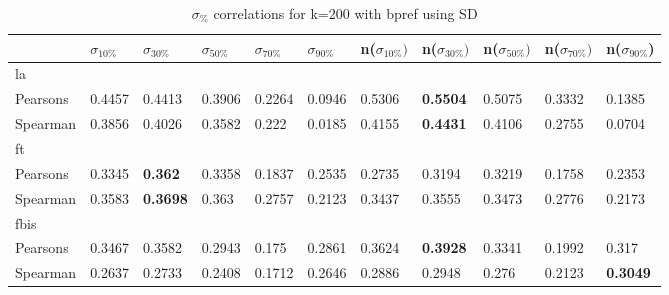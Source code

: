 \documentclass{sig-alternate}
\begin{document}
\begin{table}[h!]
\centering
\begin{tabular}{|l||l|l|l|l|l||l|l|l|l|l|}
\hline
& $\sigma_{10\%}$ & $\sigma_{30\%}$ & $\sigma_{50\%}$ & $\sigma_{70\%}$ & $\sigma_{90\%}$ & n($\sigma_{10\%})$ & n($\sigma_{30\%})$ & n($\sigma_{50\%})$ & n($\sigma_{70\%})$ & n($\sigma_{90\%}$) \\ \hline
\hline la &  &  &  &  &  &  &  &  &  &  \\ \hline
Pearsons & 0.4457 & 0.4413 & 0.3906 & 0.2264 & 0.0946 & 0.5306 & \textbf{0.5504} & 0.5075 & 0.3332 & 0.1385 \\ \hline
Spearman & 0.3856 & 0.4026 & 0.3582 & 0.222 & 0.0185 & 0.4155 & \textbf{0.4431} & 0.4106 & 0.2755 & 0.0704 \\ \hline
\hline ft &  &  &  &  &  &  &  &  &  &  \\ \hline
Pearsons & 0.3345 & \textbf{0.362} & 0.3358 & 0.1837 & 0.2535 & 0.2735 & 0.3194 & 0.3219 & 0.1758 & 0.2353 \\ \hline
Spearman & 0.3583 & \textbf{0.3698} & 0.363 & 0.2757 & 0.2123 & 0.3437 & 0.3555 & 0.3473 & 0.2776 & 0.2173 \\ \hline
\hline fbis &  &  &  &  &  &  &  &  &  &  \\ \hline
Pearsons & 0.3467 & 0.3582 & 0.2943 & 0.175 & 0.2861 & 0.3624 & \textbf{0.3928} & 0.3341 & 0.1992 & 0.317 \\ \hline
Spearman & 0.2637 & 0.2733 & 0.2408 & 0.1712 & 0.2646 & 0.2886 & 0.2948 & 0.276 & 0.2123 & \textbf{0.3049} \\ \hline
\end{tabular}
\caption{$\sigma_{\%}$ correlations for k=200 with bpref using SD}
\end{table}
\end{document}

